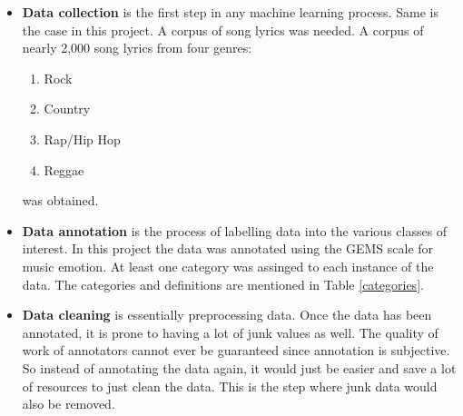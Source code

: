 \documentclass[11pt,a4paper]{article}
\begin{document}
\begin{itemize}
  \item \textbf{Data collection} is the first step in any machine learning process. Same is the case in this project. A corpus of song lyrics was needed. A corpus of nearly 2,000 song lyrics from four genres:
  \begin{enumerate}
    \item Rock
    \item Country
    \item Rap/Hip Hop
    \item Reggae
  \end{enumerate}
  was obtained.
  \item \textbf{Data annotation} is the process of labelling data into the various classes of interest. In this project the data was annotated using the GEMS scale for music emotion. At least one category was assinged to each instance of the data. The categories and definitions are mentioned in Table \ref{categories}.
  \begin{table}[!htbp]
  \centering
  \caption{List of categories with the definition of the categories according to GEMS.}
  \label{categories}
  \end{table}
  \item \textbf{Data cleaning} is essentially preprocessing data. Once the data has been annotated, it is prone to having a lot of junk values as well. The quality of work of annotators cannot ever be guaranteed since annotation is subjective. So instead of annotating the data again, it would just be easier and save a lot of resources to just clean the data. This is the step where junk data would also be removed.\\

\end{itemize}
\end{document}
